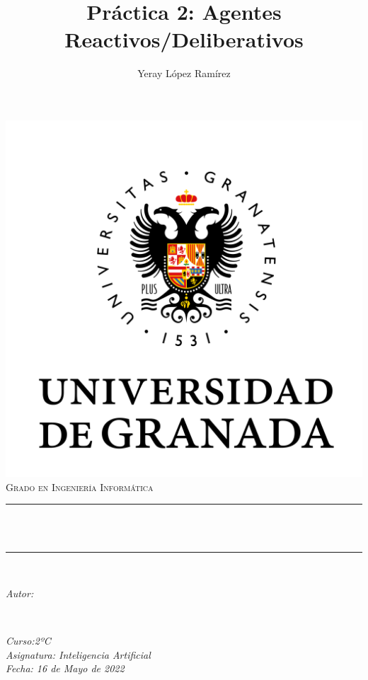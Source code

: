 \documentclass[12pt, spanish]{article}
\title{Práctica 2: Agentes Reactivos/Deliberativos \hspace{0.05cm} }
\date{}
\author{
Yeray López Ramírez \\
}
\makeatletter
\let\thetitle\@title
\let\theauthor\@author
\makeatother
\begin{document}
\begin{titlepage}
  \centering
  \vspace*{0.5 cm}
  \includegraphics[scale = 0.50]{ugr.png}\\[1.0 cm]
  \textsc{\huge Grado en Ingeniería Informática}\\[0.5 cm]
  \rule{\linewidth}{0.2 mm} \\[0.4 cm]
  { \huge \bfseries \thetitle}\\
  \rule{\linewidth}{0.2 mm} \\[1.5 cm]
  
  \begin{minipage}{0.4\textwidth}
    \begin{flushleft} \large
        \emph{Autor:}\\

        \theauthor
        \end{flushleft}
        \end{minipage}~
        \begin{minipage}{0.4\textwidth}
        \begin{flushright} \large
        \emph{Curso:2ºC \\
        Asignatura: Inteligencia Artificial \\
        Fecha: 16 de Mayo de 2022
        }
    \end{flushright}
\end{minipage}\\[1 cm]


\vfill
  
\end{titlepage}
\end{document}
